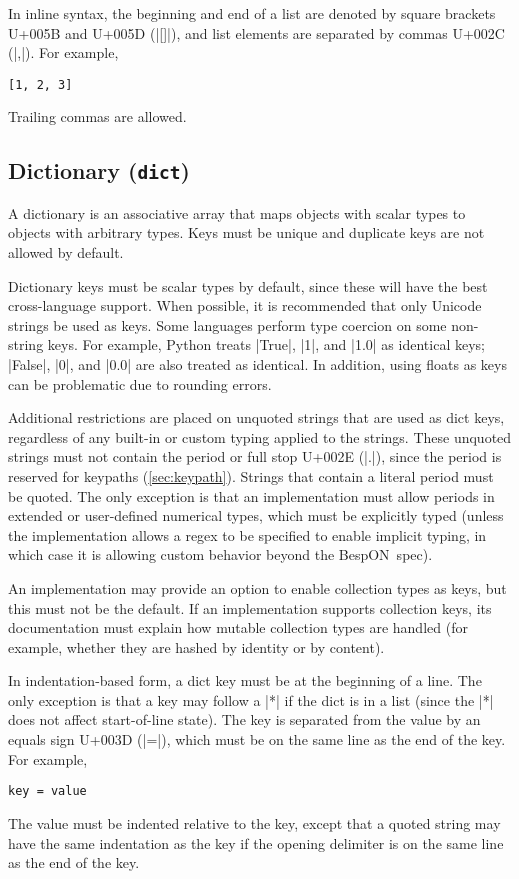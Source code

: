 \documentclass[11pt]{article}
\newcommand{\bespon}{BespON}
\begin{document}
In inline syntax, the beginning and end of a list are denoted by square brackets U+005B and U+005D (|[]|), and list elements are separated by commas U+002C (|,|).  For example,
\begin{Verbatim}
[1, 2, 3]
\end{Verbatim}
Trailing commas are allowed.


\subsection{Dictionary (\texttt{dict})}
\label{sec:type:dict}

A dictionary is an associative array that maps objects with scalar types to objects with arbitrary types.  Keys must be unique and duplicate keys are not allowed by default.

Dictionary keys must be scalar types by default, since these will have the best cross-language support.  When possible, it is recommended that only Unicode strings be used as keys.  Some languages perform type coercion on some non-string keys.  For example, Python treats |True|, |1|, and |1.0| as identical keys; |False|, |0|, and |0.0| are also treated as identical.  In addition, using floats as keys can be problematic due to rounding errors.

Additional restrictions are placed on unquoted strings that are used as dict keys, regardless of any built-in or custom typing applied to the strings.  These unquoted strings must not contain the period or full stop U+002E (|.|), since the period is reserved for keypaths (\cref{sec:keypath}).  Strings that contain a literal period must be quoted.  The only exception is that an implementation must allow periods in extended or user-defined numerical types, which must be explicitly typed (unless the implementation allows a regex to be specified to enable implicit typing, in which case it is allowing custom behavior beyond the \bespon\ spec).

An implementation may provide an option to enable collection types as keys, but this must not be the default.  If an implementation supports collection keys, its documentation must explain how mutable collection types are handled (for example, whether they are hashed by identity or by content).

In indentation-based form, a dict key must be at the beginning of a line.  The only exception is that a key may follow a |*| if the dict is in a list (since the |*| does not affect start-of-line state).  The key is separated from the value by an equals sign U+003D (|=|), which must be on the same line as the end of the key.  For example,
\begin{Verbatim}
key = value
\end{Verbatim}
The value must be indented relative to the key, except that a quoted string may have the same indentation as the key if the opening delimiter is on the same line as the end of the key.
\end{document}

